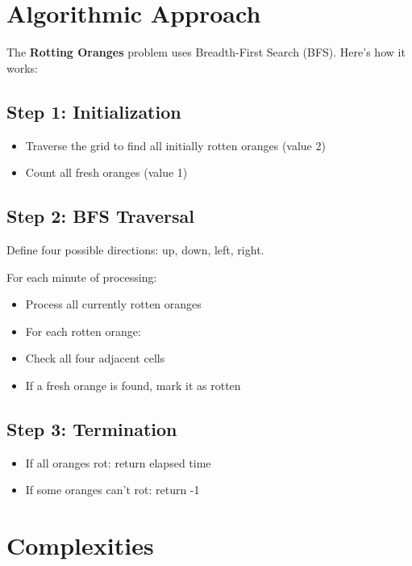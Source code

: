 \section*{Algorithmic Approach}

The \textbf{Rotting Oranges} problem uses Breadth-First Search (BFS). Here's how it works:

\subsection*{Step 1: Initialization}
\begin{itemize}
    \item Traverse the grid to find all initially rotten oranges (value 2)
    \item Count all fresh oranges (value 1)
\end{itemize}

\subsection*{Step 2: BFS Traversal}
Define four possible directions: up, down, left, right.

For each minute of processing:
\begin{itemize}
    \item Process all currently rotten oranges
    \item For each rotten orange:
    \item Check all four adjacent cells
    \item If a fresh orange is found, mark it as rotten
\end{itemize}

\subsection*{Step 3: Termination}
\begin{itemize}
    \item If all oranges rot: return elapsed time
    \item If some oranges can't rot: return -1
\end{itemize}


\section*{Complexities}

